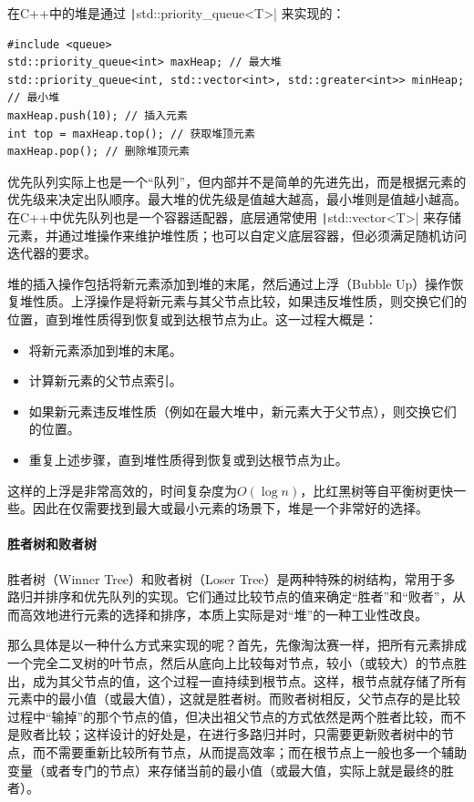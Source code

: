 在C++中的堆是通过 \texttt|std::priority_queue<T>| 来实现的：
\begin{verbatim}
#include <queue>
std::priority_queue<int> maxHeap; // 最大堆
std::priority_queue<int, std::vector<int>, std::greater<int>> minHeap; // 最小堆
maxHeap.push(10); // 插入元素
int top = maxHeap.top(); // 获取堆顶元素
maxHeap.pop(); // 删除堆顶元素
\end{verbatim}
优先队列实际上也是一个“队列”，但内部并不是简单的先进先出，而是根据元素的优先级来决定出队顺序。最大堆的优先级是值越大越高，最小堆则是值越小越高。在C++中优先队列也是一个容器适配器，底层通常使用 \texttt|std::vector<T>| 来存储元素，并通过堆操作来维护堆性质；也可以自定义底层容器，但必须满足随机访问迭代器的要求。

堆的插入操作包括将新元素添加到堆的末尾，然后通过上浮（Bubble Up）操作恢复堆性质。上浮操作是将新元素与其父节点比较，如果违反堆性质，则交换它们的位置，直到堆性质得到恢复或到达根节点为止。这一过程大概是：
\begin{itemize}
    \item 将新元素添加到堆的末尾。
    \item 计算新元素的父节点索引。
    \item 如果新元素违反堆性质（例如在最大堆中，新元素大于父节点），则交换它们的位置。
    \item 重复上述步骤，直到堆性质得到恢复或到达根节点为止。
\end{itemize}
这样的上浮是非常高效的，时间复杂度为$O(\log n)$，比红黑树等自平衡树更快一些。因此在仅需要找到最大或最小元素的场景下，堆是一个非常好的选择。

\paragraph{胜者树和败者树}
胜者树（Winner Tree）和败者树（Loser Tree）是两种特殊的树结构，常用于多路归并排序和优先队列的实现。它们通过比较节点的值来确定“胜者”和“败者”，从而高效地进行元素的选择和排序，本质上实际是对“堆”的一种工业性改良。

那么具体是以一种什么方式来实现的呢？首先，先像淘汰赛一样，把所有元素排成一个完全二叉树的叶节点，然后从底向上比较每对节点，较小（或较大）的节点胜出，成为其父节点的值，这个过程一直持续到根节点。这样，根节点就存储了所有元素中的最小值（或最大值），这就是胜者树。而败者树相反，父节点存的是比较过程中“输掉”的那个节点的值，但决出祖父节点的方式依然是两个胜者比较，而不是败者比较；这样设计的好处是，在进行多路归并时，只需要更新败者树中的节点，而不需要重新比较所有节点，从而提高效率；而在根节点上一般也多一个辅助变量（或者专门的节点）来存储当前的最小值（或最大值，实际上就是最终的胜者）。

